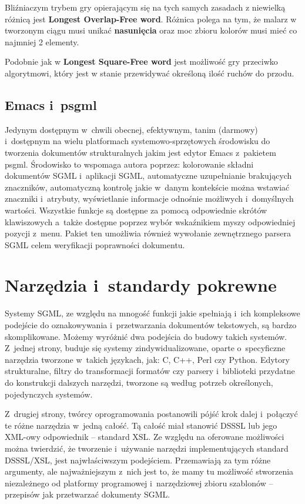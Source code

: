 \documentclass[document]{xmgr}
\begin{document}
Bliźniaczym trybem gry opierającym się na tych samych zasadach z niewielką różnicą jest \textbf{Longest Overlap-Free word}. 
Różnica polega na tym, że malarz w tworzonym ciągu musi unikać \textbf{nasunięcia} oraz moc zbioru kolorów musi mieć co najmniej 2 elementy.

Podobnie jak w \textbf{Longest Square-Free word} jest możliwość gry przeciwko algorytmowi, który jest w stanie przewidywać określoną ilość ruchów do przodu.

\section{Emacs i~psgml}

Jedynym dostępnym w~chwili
obecnej, efektywnym, tanim (darmowy) i~dostępnym na wielu
platformach systemowo-sprzętowych środowisku do tworzenia dokumentów
strukturalnych jakim jest edytor Emacs z~pakietem
psgml. Środowisko to wspomaga autora poprzez:
kolorowanie składni dokumentów SGML i~aplikacji SGML, automatyczne
uzupełnianie brakujących znaczników, automatyczną kontrolę jakie
w~danym kontekście można wstawiać znaczniki i~atrybuty, wyświetlanie
informacje odnośnie możliwych i~domyślnych wartości.
Wszystkie funkcje są dostępne za pomocą
odpowiednie skrótów klawiszowych a~także dostępne poprzez wybór
wskaźnikiem myszy odpowiedniej pozycji z~menu. Pakiet ten umożliwia
również wywołanie zewnętrznego parsera SGML celem
weryfikacji poprawności dokumentu.

\chapter{Narzędzia i~standardy pokrewne}

Systemy SGML, ze względu na mnogość funkcji jakie spełniają i~ich
kompleksowe podejście do oznakowywania i~przetwarzania dokumentów
tekstowych, są bardzo skomplikowane. Możemy wyróżnić dwa podejścia do
budowy takich systemów.  Z~jednej strony, buduje się systemy
zindywidualizowane, oparte o~specyficzne narzędzia tworzone w~takich
językach, jak: C, C++, Perl czy Python. Edytory strukturalne, filtry
do transformacji formatów czy parsery i~biblioteki
przydatne do konstrukcji dalszych narzędzi, tworzone są według potrzeb
określonych, pojedynczych systemów.

Z~drugiej strony, twórcy oprogramowania postanowili pójść krok dalej
i~połączyć te różne narzędzia w~jedną całość. Tą całość miał stanowić
DSSSL lub jego XML-owy odpowiednik -- standard XSL. Ze względu na
oferowane możliwości można twierdzić, że tworzenie i~używanie narzędzi
implementujących standard DSSSL/XSL, jest najwłaściwszym
podejściem. Przemawiają za tym różne argumenty, ale najważniejszym
z~nich jest to, że mamy tu możliwość stworzenia niezależnego od
platformy programowej i~narzędziowej zbioru szablonów -- przepisów jak
przetwarzać dokumenty SGML.
\end{document}
